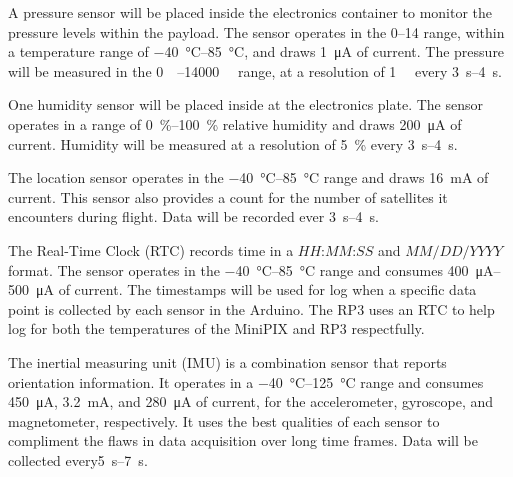 A pressure sensor will be placed inside the electronics container to monitor the pressure levels within the payload.  The sensor operates in the \SIrange{0}{14}{\bara} range, within a temperature range of \SIrange{-40}{85}{\celsius}, and draws \SI{1}{\micro\ampere} of current.  The pressure will be measured in the \SIrange{0}{14000}{\milli\bara} range, at a resolution of \SI{1}{\milli\bara} every \SIrange{3}{4}{\second}.

One humidity sensor will be placed inside at the electronics plate.  The sensor operates in a range of \SIrange{0}{100}{\percent} relative humidity and draws \SI{200}{\micro\ampere} of current.  Humidity will be measured at a resolution of \SI{5}{\percent} every \SIrange{3}{4}{\second}.

The location sensor operates in the \SIrange{-40}{85}{\celsius} range and draws \SI{16}{\milli\ampere} of current.  This sensor also provides a count for the number of satellites it encounters during flight.  Data will be  recorded ever \SIrange{3}{4}{\second}. 
 
The Real-Time Clock (RTC) records time in a $HH$:$MM$:$SS$ and $MM/DD/YYYY$ format.  The sensor operates in the \SIrange{-40}{85}{\celsius} range and consumes \SIrange{400}{500}{\micro\ampere} of current.  The timestamps  will be used for log when a specific data point is collected by each sensor in the Arduino.  The RP3  uses an RTC to help log for both the temperatures of the MiniPIX and RP3 respectfully.

The inertial measuring unit (IMU) is a combination sensor that reports orientation information.  It operates in a \SIrange{-40}{125}{\celsius} range and consumes \SI{450}{\micro\ampere}, \SI{3.2}{\milli\ampere}, and \SI{280}{\micro\ampere} of current, for the accelerometer, gyroscope, and magnetometer, respectively.  It uses the best qualities of each sensor to compliment the flaws in data acquisition over long time frames.  Data will be collected every\SIrange{5}{7}{\second}.
 


